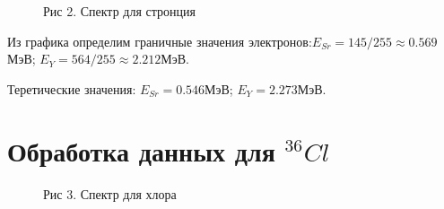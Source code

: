 \documentclass[12pt]{article}
\begin{document}
    \begin{figure}[h!]
      \begin{minipage}[h]{\linewidth}
        Рис 2. Спектр для стронция
      \end{minipage}
      \label{chart:strontium}
    \end{figure}

    Из графика определим граничные значения электронов:$E_{Sr} = 145/255
    \approx 0.569$МэВ; $E_Y = 564/255 \approx 2.212$МэВ.

    Теретические значения: $E_{Sr} = 0.546$МэВ; $E_Y = 2.273$МэВ.


  \newpage
  \section{Обработка данных для $^{36}Cl$}

    \begin{figure}[h!]
      \begin{minipage}[h]{\linewidth}
        Рис 3. Спектр для хлора
      \end{minipage}
      \label{chart:chlorine}
    \end{figure}
\end{document}
